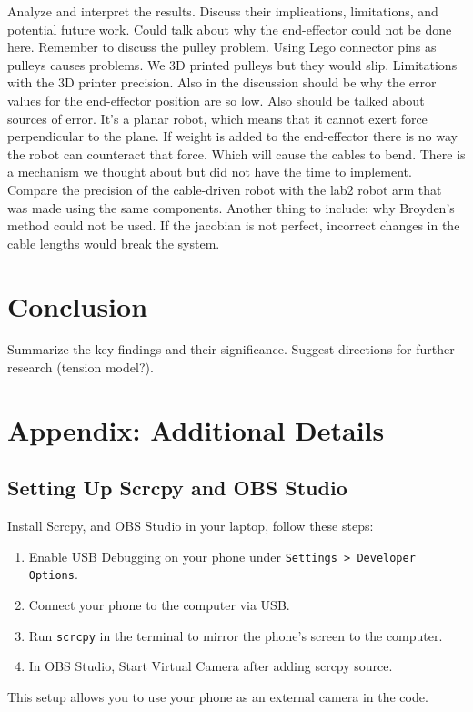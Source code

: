 \documentclass[11pt]{article}
\begin{document}
Analyze and interpret the results. Discuss their implications, limitations, and potential future work.
Could talk about why the end-effector could not be done here.
Remember to discuss the pulley problem. Using Lego connector pins as pulleys causes problems. We 3D printed pulleys
but they would slip. Limitations with the 3D printer precision. Also in the discussion should be why the error
values for the end-effector position are so low. Also should be talked about sources of error.
It's a planar robot, which means that it cannot exert force perpendicular to the plane. If weight is added to the end-effector
there is no way the robot can counteract that force. Which will cause the cables to bend. There is a mechanism we thought
about but did not have the time to implement. Compare the precision of the cable-driven robot with the lab2 robot arm that was
made using the same components. Another thing to include: why Broyden's method could not be used. If the jacobian is not
perfect, incorrect changes in the cable lengths would break the system.

\section{Conclusion}
Summarize the key findings and their significance. Suggest directions for further research (tension model?).





\appendix
\section{Appendix: Additional Details}
\subsection{Setting Up Scrcpy and OBS Studio}
Install Scrcpy, and OBS Studio in your laptop, follow these steps:
\begin{enumerate}
    \item Enable USB Debugging on your phone under \texttt{Settings > Developer Options}.
    \item Connect your phone to the computer via USB.
    \item Run \texttt{scrcpy} in the terminal to mirror the phone's screen to the computer.
    \item In OBS Studio, Start Virtual Camera after adding scrcpy source.
\end{enumerate}
This setup allows you to use your phone as an external camera in the code.
\end{document}
